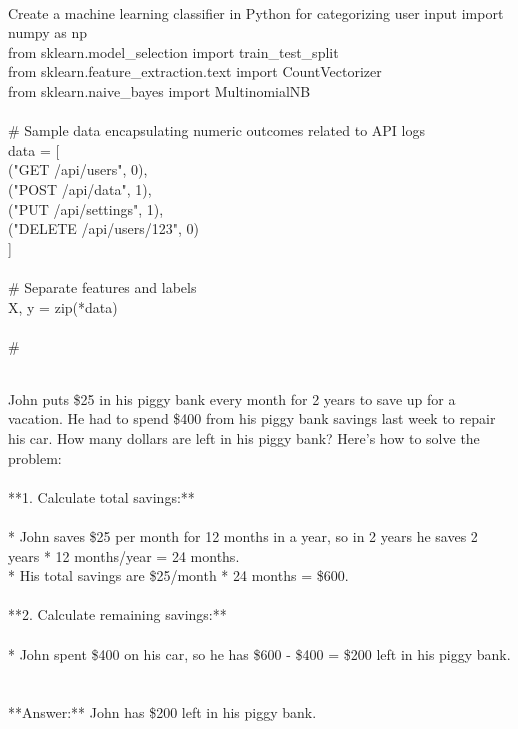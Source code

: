 \begin{tcolorbox}[title=\textit{Code} instruction]
\quad \\
\small 
Create a machine learning classifier in Python for categorizing user input
import numpy as np\\ from sklearn.model\_selection import train\_test\_split\\ from sklearn.feature\_extraction.text import CountVectorizer\\ from sklearn.naive\_bayes import MultinomialNB\\ \\ \# Sample data encapsulating numeric outcomes related to API logs\\ data = [\\     ("GET /api/users", 0),\\     ("POST /api/data", 1),\\     ("PUT /api/settings", 1),\\     ("DELETE /api/users/123", 0)\\ ]\\ \\ \# Separate features and labels\\ X, y = zip(*data)\\ \\ \# \\
\end{tcolorbox}

\begin{tcolorbox}[title=\textit{Math} instruction]
\quad \\
\small 
John puts \$25 in his piggy bank every month for 2 years to save up for a vacation. He had to spend \$400 from his piggy bank savings last week to repair his car. How many dollars are left in his piggy bank?
Here's how to solve the problem:\\ \\ **1. Calculate total savings:**\\ \\ * John saves \$25 per month for 12 months in a year, so in 2 years he saves 2 years * 12 months/year = 24 months.\\ * His total savings are \$25/month * 24 months = \$600.\\ \\ **2. Calculate remaining savings:**\\ \\ * John spent \$400 on his car, so he has \$600 - \$400 = \$200 left in his piggy bank.\\ \\ \\ **Answer:** John has \$200 left in his piggy bank. \\ 
\end{tcolorbox}

\clearpage